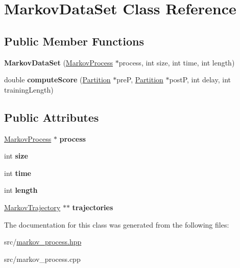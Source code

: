\hypertarget{classMarkovDataSet}{\section{Markov\-Data\-Set Class Reference}
\label{classMarkovDataSet}
}
\subsection*{Public Member Functions}
\begin{DoxyCompactItemize}
\item 
\hypertarget{classMarkovDataSet_af5652def3bd861e32423628515212e1a}{{\bfseries Markov\-Data\-Set} (\hyperlink{classMarkovProcess}{Markov\-Process} $\ast$process, int size, int time, int length)}\label{classMarkovDataSet_af5652def3bd861e32423628515212e1a}

\item 
\hypertarget{classMarkovDataSet_a90e28188b58acc59d75d44e01022e180}{double {\bfseries compute\-Score} (\hyperlink{classPartition}{Partition} $\ast$pre\-P, \hyperlink{classPartition}{Partition} $\ast$post\-P, int delay, int training\-Length)}\label{classMarkovDataSet_a90e28188b58acc59d75d44e01022e180}

\end{DoxyCompactItemize}
\subsection*{Public Attributes}
\begin{DoxyCompactItemize}
\item 
\hypertarget{classMarkovDataSet_a4634e9ebbab3500e07fc039b7917c219}{\hyperlink{classMarkovProcess}{Markov\-Process} $\ast$ {\bfseries process}}\label{classMarkovDataSet_a4634e9ebbab3500e07fc039b7917c219}

\item 
\hypertarget{classMarkovDataSet_ad00c1b3025f6fcbd67e7c23b456962bd}{int {\bfseries size}}\label{classMarkovDataSet_ad00c1b3025f6fcbd67e7c23b456962bd}

\item 
\hypertarget{classMarkovDataSet_a5ac0cfb2d1cbe80c7f4e6c980c93dcdd}{int {\bfseries time}}\label{classMarkovDataSet_a5ac0cfb2d1cbe80c7f4e6c980c93dcdd}

\item 
\hypertarget{classMarkovDataSet_a4506dddc00f33e4e889a5de277bd2966}{int {\bfseries length}}\label{classMarkovDataSet_a4506dddc00f33e4e889a5de277bd2966}

\item 
\hypertarget{classMarkovDataSet_aee1a6c899637e2c9cc3c22977b17f7b2}{\hyperlink{classMarkovTrajectory}{Markov\-Trajectory} $\ast$$\ast$ {\bfseries trajectories}}\label{classMarkovDataSet_aee1a6c899637e2c9cc3c22977b17f7b2}

\end{DoxyCompactItemize}


The documentation for this class was generated from the following files\-:\begin{DoxyCompactItemize}
\item 
src/\hyperlink{markov__process_8hpp}{markov\-\_\-process.\-hpp}\item 
src/markov\-\_\-process.\-cpp\end{DoxyCompactItemize}
